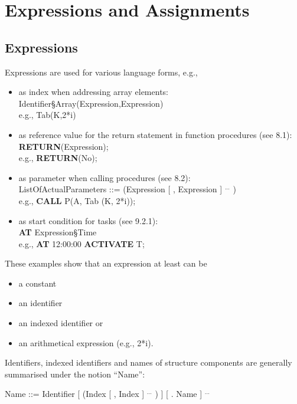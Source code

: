 \chapter{Expressions and Assignments}   %

\section{Expressions}   %

Expressions are used for various language forms, e.g.,

\begin{itemize}
\item as index when addressing array elements:\\
      Identifier\S Array(Expression,Expression)\\
      e.g., Tab(K,2*i)
\item as reference value for the return statement in function procedures
      (see 8.1):\\
      {\bf RETURN}(Expression);\\
      e.g., {\bf RETURN}(No);
\item as parameter when calling procedures (see 8.2):\\
      ListOfActualParameters ::= (Expression [ , Expression ] $^{...}$ )\\
      e.g., {\bf CALL} P(A, Tab (K, 2*i));
\item as start condition for tasks (see 9.2.1):\\
      {\bf AT} Expression\S Time\\
      e.g., {\bf AT} 12:00:00 {\bf ACTIVATE} T;
\end{itemize}

These examples show that an expression at least can be

\begin{itemize}
\item a constant
\item an identifier
\item an indexed identifier or
\item an arithmetical expression (e.g., 2*i).
\end{itemize}

Identifiers, indexed identifiers and names of structure components are
generally summarised under the notion ``Name'':

\begin{front}
Name ::= Identifier [ (Index [ , Index ] $^{...}$ ) ] [ . Name ] $^{...}$
\end{front}
\begin{grammar}

\end{grammar}


